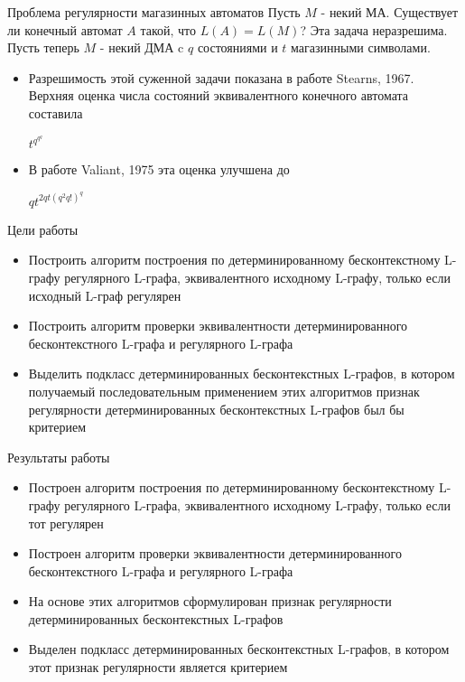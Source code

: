 \documentclass{beamer}
\begin{document}
\begin{frame} {Проблема регулярности магазинных автоматов}
Пусть $M$ - некий МА. Существует ли конечный автомат $A \text{ такой, что } L(A)=L(M)$?
Эта задача неразрешима.\\
\vspace{0.5cm}
Пусть теперь $M$ - некий ДМА c $q$ состояниями и $t$ магазинными символами.
  \begin{itemize}
    \item Разрешимость этой суженной задачи показана в работе Stearns, 1967. Верхняя оценка числа состояний эквивалентного конечного автомата составила {\LARGE$t^{q^{q^q}}$\par}
    \item В работе Valiant, 1975 эта оценка улучшена до {\LARGE$qt^{2qt(q^2q!)^q}$\par}
  \end{itemize}
\end{frame}

\begin{frame} {Цели работы}
\begin{itemize}
  \item Построить алгоритм построения по детерминированному бесконтекстному L-графу регулярного L-графа, эквивалентного исходному L-графу, только если исходный L-граф регулярен
  \item Построить алгоритм проверки эквивалентности детерминированного бесконтекстного L-графа и регулярного L-графа
  \item Выделить подкласс детерминированных бесконтекстных L-графов, в котором получаемый последовательным применением этих алгоритмов признак регулярности детерминированных бесконтекстных L-графов был бы критерием
\end{itemize}
\end{frame}

\begin{frame} {Результаты работы}
\begin{itemize}
  \item Построен алгоритм построения по детерминированному бесконтекстному L-графу регулярного L-графа, эквивалентного исходному  L-графу, только если тот регулярен
  \item Построен алгоритм проверки эквивалентности детерминированного бесконтекстного L-графа и регулярного L-графа
  \item На основе этих алгоритмов сформулирован признак регулярности детерминированных бесконтекстных L-графов
  \item Выделен подкласс детерминированных бесконтекстных L-графов, в котором этот признак регулярности является критерием
\end{itemize}
\end{frame}
\end{document}
